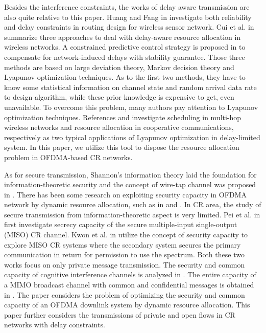 \documentclass[journal]{IEEEtran}
\begin{document}
Besides the interference constraints, the works of delay aware transmission are also quite relative to this paper. Huang and Fang in \cite{huang2008multiconstrained} investigate both reliability and delay constraints in
 routing design for wireless sensor network.
Cui et al. in \cite{cui2012survey} summarize three approaches to deal with delay-aware resource allocation in wireless networks. A constrained predictive control strategy is
proposed in \cite{5572437} to compensate for network-induced delays with stability guarantee. Those three
methods are based on large deviation theory, Markov decision theory and Lyapunov optimization techniques.
As to the first two methods, they have to know some statistical  information on channel state and random arrival data rate to
design algorithm, while these prior knowledge is expensive to get, even unavailable. To overcome this problem, many authors
pay attention to Lyapunov optimization techniques. References \cite{xue2010delay} and \cite{urgaonkar2009delay} investigate scheduling in
multi-hop wireless networks and resource allocation in cooperative communications, respectively  as two typical applications
of Lyapunov optimization  in delay-limited system. In this paper, we utilize this tool to
dispose the resource allocation problem in OFDMA-based  CR networks.





As for secure transmission, Shannon's information theory  laid the foundation for information-theoretic
security\cite{shannon1949communication} and the concept of wire-tap channel  was proposed in \cite{ozarow1985wire}.  There has been
some research on exploiting  security capacity  in OFDMA network by dynamic resource allocation, such as in \cite{ng2012energy} and
\cite{wang2011power}. In CR area, the study of secure transmission from
information-theoretic aspect is very limited. Pei et al. in \cite{pei2010secure} first investigate  secrecy capacity of the secure
multiple-input single-output (MISO) CR channel. Kwon et al. in \cite{kwon2012secure} utilize the concept of security capacity to
explore MISO CR systems where the secondary system secures the primary communication in return for permission to use the
spectrum. Both these two works focus on only private message transmission. The security and common capacity of cognitive
interference channels is analyzed in \cite{liang2009capacity}. The entire capacity of a
MIMO broadcast channel with common and confidential messages is obtained in \cite{ekrem2012capacity}. The paper \cite{conf/wcnc/ZhuYG13} considers the problem of optimizing the
security and common capacity of  an OFDMA downlink system by dynamic resource allocation.  This paper further considers the transmissions of private and open flows in CR networks with delay constraints.
\end{document}
